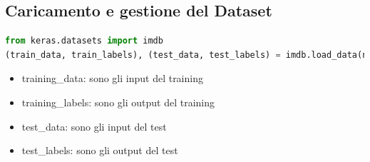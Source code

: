 \subsection{Caricamento e gestione del Dataset}

\begin{lstlisting}[language=Python, caption=Caricamento del dataset IMDb Dataset.]
from keras.datasets import imdb
(train_data, train_labels), (test_data, test_labels) = imdb.load_data(num_words=10000)
\end{lstlisting}

\begin{itemize}
    \item training\_data: sono gli input del training
    \item training\_labels: sono gli output del training
    \item test\_data: sono gli input del test
    \item test\_labels: sono gli output del test
\end{itemize}

